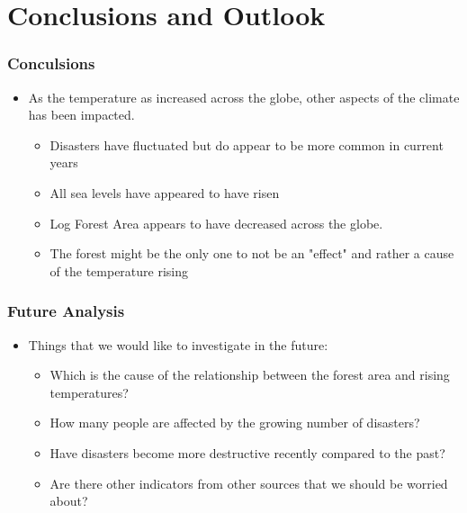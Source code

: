 \documentclass[handout, xcolor=dvipsnames]{beamer}
\begin{document}
\section{Conclusions and Outlook}  

\begin{frame}
	\frametitle{Conculsions} 
	\begin{itemize}
	\item As the temperature as increased across the globe, other aspects of the climate has been impacted.
        \begin{itemize}
            \item Disasters have fluctuated but do appear to be more common in current years
            \item All sea levels have appeared to have risen
            \item Log Forest Area appears to have decreased across the globe. 
            \item The forest might be the only one to not be an "effect" and rather a cause of the temperature rising
        \end{itemize}
	\end{itemize}
\end{frame}


\begin{frame}
	\frametitle{Future Analysis} 
	\begin{itemize}
	\item Things that we would like to investigate in the future:
	\begin{itemize}
	    \item Which is the cause of the relationship between the forest area and rising temperatures?
        \item How many people are affected by the growing number of disasters?
        \item Have disasters become more destructive recently compared to the past?
        \item Are there other indicators from other sources that we should be worried about?
	\end{itemize}
	\end{itemize}
\end{frame}

\end{document}
